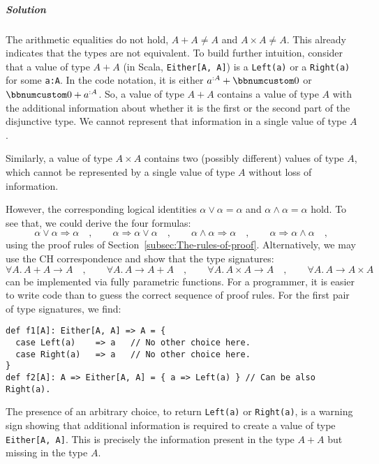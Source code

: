 \subparagraph{Solution}

The arithmetic equalities do not hold, $A+A\neq A$ and $A\times A\ne A$.
This already indicates that the types are not equivalent. To build
further intuition, consider that a value of type $A+A$ (in Scala,
\lstinline!Either[A, A]!) is a \lstinline!Left(a)! or a \lstinline!Right(a)!
for some \lstinline!a:A!. In the code notation, it is either $a^{:A}+\bbnum 0$
or $\bbnum 0+a^{:A}$. So, a value of type $A+A$ contains a value
of type $A$ with the additional information about whether it is the
first or the second part of the disjunctive type. We cannot represent
that information in a single value of type $A$. 

Similarly, a value of type $A\times A$ contains two (possibly different)
values of type $A$, which cannot be represented by a single value
of type $A$ without loss of information.

However, the corresponding logical identities $\alpha\vee\alpha=\alpha$
and $\alpha\wedge\alpha=\alpha$ hold. To see that, we could derive
the four formulas:
\[
\alpha\vee\alpha\Rightarrow\alpha\quad,\quad\quad\alpha\Rightarrow\alpha\vee\alpha\quad,\quad\quad\alpha\wedge\alpha\Rightarrow\alpha\quad,\quad\quad\alpha\Rightarrow\alpha\wedge\alpha\quad,
\]
using the proof rules of Section~\ref{subsec:The-rules-of-proof}.
Alternatively, we may use the CH correspondence and show that the
type signatures:
\[
\forall A.\,A+A\rightarrow A\quad,\quad\quad\forall A.\,A\rightarrow A+A\quad,\quad\quad\forall A.\,A\times A\rightarrow A\quad,\quad\quad\forall A.\,A\rightarrow A\times A\quad
\]
can be implemented via fully parametric functions. For a programmer,
it is easier to write code than to guess the correct sequence of proof
rules. For the first pair of type signatures, we find:
\begin{lstlisting}
def f1[A]: Either[A, A] => A = {
  case Left(a)    => a   // No other choice here.
  case Right(a)   => a   // No other choice here.
}
def f2[A]: A => Either[A, A] = { a => Left(a) } // Can be also Right(a).
\end{lstlisting}
The presence of an arbitrary choice, to return \lstinline!Left(a)!
or \lstinline!Right(a)!, is a warning sign showing that additional
information is required to create a value of type \lstinline!Either[A, A]!.
This is precisely the information present in the type $A+A$ but missing
in the type $A$.

